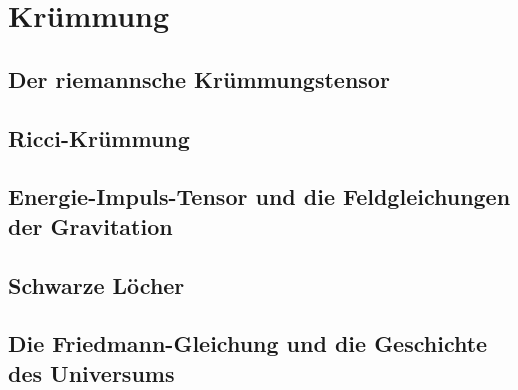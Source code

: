 %
%
%
\chapter{Krümmung
\label{chapter:kruemmung}}

\section{Der riemannsche Krümmungstensor}

\section{Ricci-Krümmung}

\section{Energie-Impuls-Tensor und die Feldgleichungen der Gravitation}

\section{Schwarze Löcher}

\section{Die Friedmann-Gleichung und die Geschichte des Universums}

